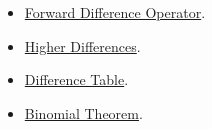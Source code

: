 \begin{remark*}
\end{remark*}

\begin{dependencies}
\begin{itemize}
  \item \hyperref[def:forward-difference]{Forward Difference Operator}.
  \item \hyperref[def:higher-differences]{Higher Differences}.
  \item \hyperref[def:difference-table]{Difference Table}.
  \item \hyperref[thm:binomial-theorem]{Binomial Theorem}.
\end{itemize}
\end{dependencies}
\clearpage
